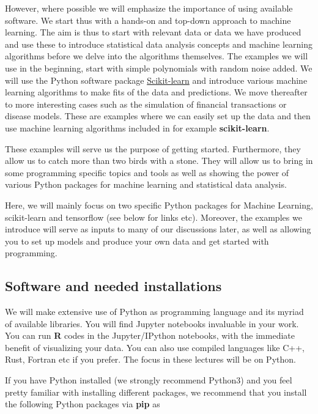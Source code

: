 \documentclass[%
oneside,                 %
final,                   %
10pt]{article}
\begin{document}
However, where possible we will emphasize the
importance of using available software. We start thus with a hands-on
and top-down approach to machine learning. The aim is thus to start with
relevant data or data we have produced 
and use these to introduce statistical data analysis
concepts and machine learning algorithms before we delve into the
algorithms themselves. The examples we will use in the beginning, start with simple
polynomials with random noise added. We will use the Python
software package \href{{http://scikit-learn.org/stable/}}{Scikit-learn} and
introduce various machine learning algorithms to make fits of
the data and predictions. We move thereafter to more interesting
cases such as the simulation of financial transactions or disease
models. These are examples where we can easily set up the data and
then use machine learning algorithms included in for example
\textbf{scikit-learn}. 

These examples will serve us the purpose of getting
started. Furthermore, they allow us to catch more than two birds with
a stone. They will allow us to bring in some programming specific
topics and tools as well as showing the power of various Python 
packages for machine learning and statistical data analysis.  

Here, we will mainly focus on two
specific Python packages for Machine Learning, scikit-learn and
tensorflow (see below for links etc).  Moreover, the examples we
introduce will serve as inputs to many of our discussions later, as
well as allowing you to set up models and produce your own data and
get started with programming.





\subsection*{Software and needed installations}

We will make extensive use of Python as programming language and its
myriad of available libraries.  You will find
Jupyter notebooks invaluable in your work.  You can run \textbf{R}
codes in the Jupyter/IPython notebooks, with the immediate benefit of
visualizing your data. You can also use compiled languages like C++,
Rust, Fortran etc if you prefer. The focus in these lectures will be
on Python.


If you have Python installed (we strongly recommend Python3) and you feel
pretty familiar with installing different packages, we recommend that
you install the following Python packages via \textbf{pip} as 
\end{document}
